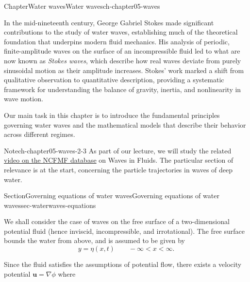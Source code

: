 \documentclass[oneside,10pt,]{book}
\numberwithin{equation}{section}
\newcommand{\bu}{\boldsymbol{u}}
\begin{document}
%
%
\typeout{************************************************}
\typeout{************************************************}
%
\begin{chapterptx}{Chapter}{Water waves}{}{Water waves}{}{}{ch-chapter05-waves}
\renewcommand*{\chaptername}{Chapter}
\begin{introduction}{}%
In the mid-nineteenth century, George Gabriel Stokes made significant contributions to the study of water waves, establishing much of the theoretical foundation that underpins modern fluid mechanics. His analysis of periodic, finite-amplitude waves on the surface of an incompressible fluid led to what are now known as \emph{Stokes waves}, which describe how real waves deviate from purely sinusoidal motion as their amplitude increases. Stokes’ work marked a shift from qualitative observation to quantitative description, providing a systematic framework for understanding the balance of gravity, inertia, and nonlinearity in wave motion.%
\par
Our main task in this chapter is to introduce the fundamental principles governing water waves and the mathematical models that describe their behavior across different regimes.%
\begin{note}{Note}{}{ch-chapter05-waves-2-3}%
As part of our lecture, we will study the related \href{https://techtv.mit.edu/collections/ifluids/videos/32616-waves-in-fluids}{video on the NCFMF database} on Waves in Fluids. The particular section of relevance is at the start, concerning the particle trajectories in waves of deep water.%
\end{note}
\end{introduction}%
%
%
\typeout{************************************************}
\typeout{************************************************}
%
\begin{sectionptx}{Section}{Governing equations of water waves}{}{Governing equations of water waves}{}{}{sec-waterwaves-equations}
\begin{introduction}{}%
We shall consider the case of waves on the free surface of a two-dimensional potential fluid (hence inviscid, incompressible, and irrotational). The free surface bounds the water from above, and is assumed to be given by%
\begin{equation*}
y = \eta(x, t) \qquad -\infty < x < \infty.
\end{equation*}
%
\par
Since the fluid satisfies the assumptions of potential flow, there exists a velocity potential \(\bu = \nabla \phi\) where%

\end{introduction}
\end{sectionptx}
\end{chapterptx}
\end{document}
